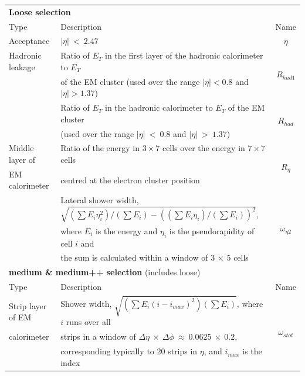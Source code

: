	\begin {table}[h!]
	\begin{center}
  	\begin{tabular}{llc}
		\hline
		\multicolumn{3}{l}{{\bf Loose selection}} 																					\\ 
		Type 				& Description																	& Name 					\\
		\hline
\rule{0pt}{3ex}Acceptance 			& $|\eta|~<~2.47$ 														& $\eta$				\\
\rule{0pt}{4ex}Hadronic leakage	& Ratio of $E_{T}$ in the first layer of the hadronic calorimeter to $E_{T}$ & \multirow{2}{*}{$R_{had1}$}			\\
							& of the EM cluster (used over the range $|\eta|<0.8$ and $|\eta|>1.37$)		&						\\
							\rule{0pt}{3ex} 
							& Ratio of $E_{T}$ in the hadronic calorimeter to $E_{T}$ of the EM cluster 	& \multirow{2}{*}{$R_{had}$}			\\
							& (used over the range $|\eta|~<~0.8$ and $|\eta|~>~1.37$)						&						\\
\rule{0pt}{4ex}Middle layer of  	& Ratio of the energy in $3\times7$ cells over the energy in $7\times7$ cells	& \multirow{2}{*}{$R_{\eta}$}	\\
		EM calorimeter		& centred at the electron cluster position												&						\\
							\rule{0pt}{3ex} 
							& Lateral shower width, $\sqrt{(\sum{E_{i} \eta_{i}^{2}})/(\sum{E_{i}}) - ((\sum{E_{i} \eta_{i}})/(\sum{E_{i}}))^{2}}$,  	& \multirow{3}{*}{$\omega_{\eta2}$}		\\
							& where $E_{i}$ is the energy and $\eta_{i}$ is the pseudorapidity of cell $i$ and & 			\\
							& the sum is calculated  within a window of 3 $\times$ 5 cells								&						\\
		\hline
		\hline
		\multicolumn{3}{l}{{\bf medium \& medium++ selection} (includes loose)}																	\\
		Type 				& Description																	& Name 		 			\\
		\hline
\rule{0pt}{3ex}Strip layer of EM & Shower width, $\sqrt{(\sum{E_{i}(i - i_{max})^{2}})(\sum{E_{i}})}$, where $i$ runs over all & \multirow{4}{*}{$\omega_{stot}$}	\\
		calorimeter 		& strips in a window of $\Delta\eta~\times~\Delta\phi~\approx~0.0625~\times~0.2$, &			\\
							& corresponding typically to 20 strips in $\eta$, and $i_{max}$ is the index 	& 						\\

\end{tabular}
\end{center}
\end{table}
